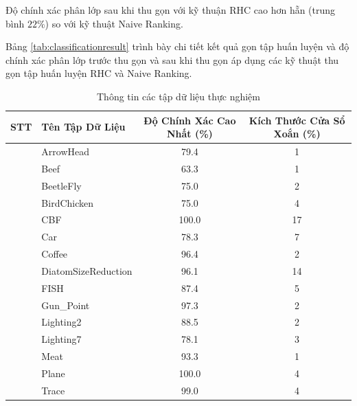 \documentclass[13pt,oneside]{scrbook}
\newcounter{magicrownumbers}
\newcommand\rownumber{\stepcounter{magicrownumbers}\arabic{magicrownumbers}}
\begin{document}
Độ chính xác phân lớp sau khi thu gọn với kỹ thuận RHC cao hơn hẵn (trung bình $22\%$) so với kỹ thuật Naive Ranking.

Bảng \ref{tab:classificationresult} trình bày chi tiết kết quả gọn tập huấn luyện và độ chính xác phân lớp trước thu gọn và sau khi thu gọn áp dụng các kỹ thuật thu gọn tập huấn luyện RHC và Naive Ranking.
\begin{table}[!htb]
\centering
    \begin{tabular}{| c | l | c | c |}
    \hline
	STT & Tên Tập Dữ Liệu & Độ Chính Xác Cao Nhất (\%) & Kích Thước Cửa Sổ Xoắn (\%)\\ \hline
    \rownumber  & ArrowHead & 79.4& 1\\ \hline
	\rownumber  & Beef & 63.3& 1\\ \hline
	\rownumber  & BeetleFly & 75.0& 2\\ \hline
	\rownumber  & BirdChicken & 75.0& 4\\ \hline
	\rownumber  & CBF & 100.0& 17\\ \hline
	\rownumber  & Car & 78.3& 7\\ \hline
	\rownumber  & Coffee & 96.4& 2\\ \hline
	\rownumber  & DiatomSizeReduction & 96.1& 14\\ \hline
	\rownumber  & FISH & 87.4& 5\\ \hline
	\rownumber  & Gun\_Point & 97.3& 2\\ \hline
	\rownumber  & Lighting2 & 88.5& 2\\ \hline
	\rownumber  & Lighting7 & 78.1& 3\\ \hline
	\rownumber  & Meat & 93.3& 1\\ \hline
	\rownumber  & Plane & 100.0& 4\\ \hline
	\rownumber  & Trace & 99.0& 4\\ \hline
    \end{tabular}
    \caption{Thông tin các tập dữ liệu thực nghiệm}\label{tab:dataset}
\end{table}
\end{document}

